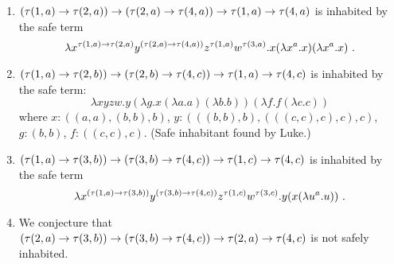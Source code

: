 \documentclass{article}
\begin{document}
\begin{itemize}
\begin{enumerate}
\item
$(\tau(1,a) \rightarrow \tau(2,a)) \rightarrow (\tau(2,a) \rightarrow \tau(4,a)) \rightarrow \tau(1,a) \rightarrow
\tau(4,a)$ is inhabited by the safe term $$\lambda x^{\tau(1,a)
\typear \tau(2,a)} y^{(\tau(2,a) \typear \tau(4,a))} z^{\tau(1,a)}
w^{\tau(3,a)} . x (\lambda x^a . x) (\lambda x^a . x)\ .$$

\item $(\tau(1,a) \rightarrow \tau(2,b)) \rightarrow (\tau(2,b) \rightarrow \tau(4,c)) \rightarrow \tau(1,a) \rightarrow
\tau(4,c)$
is inhabited by the safe term:
$$ \lambda x y z w . y (\lambda g . x (\lambda a . a) (\lambda b . b)) (\lambda f . f (\lambda c . c))$$
where
$x : ((a, a), (b, b), b)$,
$y : (((b, b), b), (((c, c), c), c), c)$,
$g : (b, b)$,
$f : ((c, c), c)$. (Safe inhabitant found by Luke.)
\item
$(\tau(1,a) \rightarrow \tau(3,b)) \rightarrow (\tau(3,b) \rightarrow \tau(4,c)) \rightarrow \tau(1,c) \rightarrow
\tau(4,c)$
is inhabited by the safe term
$$ \lambda x^{(\tau(1,a) \rightarrow \tau(3,b))} y^{(\tau(3,b) \rightarrow \tau(4,c))} z^{\tau(1,c)} w^{\tau(3,c)} . y (x (\lambda u^a . u)) \ .$$
\item We conjecture that $(\tau(2,a) \rightarrow \tau(3,b)) \rightarrow (\tau(3,b) \rightarrow \tau(4,c)) \rightarrow \tau(2,a) \rightarrow
\tau(4,c)$ is not safely inhabited.
\end{enumerate}

\end{itemize}
\end{document}
